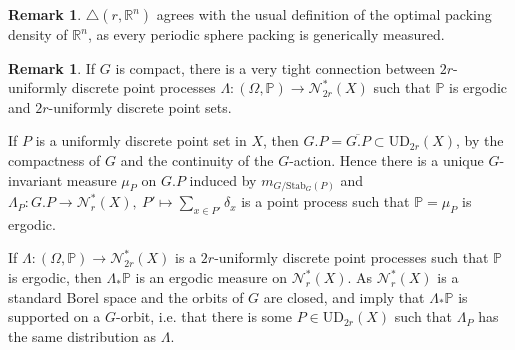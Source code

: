 \documentclass[12pt,reqno,a4paper]{amsart}
\theoremstyle{theorem}
\theoremstyle{definition}
\newtheorem{definition}[theorem]{Definition}
\newtheorem{remark}[theorem]{Remark}
\numberwithin{theorem}{section}
\numberwithin{equation}{section}
\newcommand{\R}{\mathbb{R}}
\newcommand{\UD}{\mathrm{UD}}
\begin{document}
\begin{remark}
	$\triangle(r,\R^n)$ agrees with the usual definition of the optimal packing density of $\R^n$, as every periodic sphere packing is generically measured.
\end{remark}


\begin{remark}
	If $G$ is compact, there is a very tight connection between $2r$-uniformly discrete point processes $\Lambda:(\Omega, \mathbb{P})\to \mathcal{N}^*_{2r}(X)$ such that $\mathbb{P}$ is ergodic and $2r$-uniformly discrete point sets.
	
	If $P$ is a uniformly discrete point set in $X$, then $G.P = \overline{G.P}\subset \UD_{2r}(X)$, by the compactness of $G$ and the continuity of the $G$-action. Hence there is a unique $G$-invariant measure $\mu_P$ on $G.P$ induced by $m_{G/\mathrm{Stab}_G(P)}$ and $\Lambda_P: G.P \to \mathcal{N}_r^*(X),\ P'\mapsto \sum_{x\in P'}\delta_x$ is a point process such that $\mathbb{P}=\mu_P$ is ergodic.
	
	If  $\Lambda:(\Omega, \mathbb{P})\to \mathcal{N}^*_{2r}(X)$ is a  $2r$-uniformly discrete point processes such that $\mathbb{P}$ is ergodic, then $\Lambda_*\mathbb{P}$ is an ergodic measure on $\mathcal{N}_r^*(X)$. As $\mathcal{N}_r^*(X)$ is a standard Borel space and the orbits of $G$ are closed, \cite[Proposition 2.1.12]{Zimmer} and \cite[Proposition 2.1.10]{Zimmer} imply that $\Lambda_*\mathbb{P}$ is supported on a $G$-orbit, i.e. that there is some $P\in \UD_{2r}(X)$ such that $\Lambda_P$ has the same distribution as $\Lambda$.
\end{remark}
\end{document}
